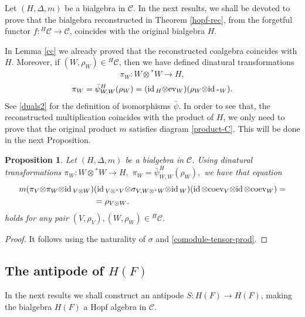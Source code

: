 \documentclass[11pt]{amsart}
\newcommand{\coev}{\mbox{coev}}
\newcommand{\ev}{\mbox{ev}}
\newcommand{\uc}{f}
\newcommand{\ot}{{\otimes}}
\newcommand{\vc}{{\mathcal C}}
\newcommand{\id}{\mbox{\rm id\,}}
\renewcommand{\_}[1]{\mbox{$_{\left( #1 \right)}$}}
\theoremstyle{plain}
\numberwithin{equation}{section}
\newtheorem{prop}[teo]{Proposition}
\theoremstyle{definition}
\theoremstyle{remark}
\def\pf{\begin{proof}}
\def\epf{\end{proof}}
\theoremstyle{introTheorems}
\begin{document}
Let $(H,\Delta, m)$ be a bialgebra in $\vc$. In the next results, we shall be devoted to prove that the  bialgebra reconstructed in Theorem \ref{hopf-rec}, from the forgetful functor  $\uc:{}^H\vc\to\vc$, coincides with the original  bialgebra $H$. 

\medbreak

In Lemma \ref{cc} we already proved that the reconstructed coalgebra coincides with $H$. Moreover, if $(W, \rho_W)\in {}^H\vc$, then we have defined dinatural transformations
$$\pi_W:W\ot {}^*W\to  H,$$  $$\pi_W=\bar{\psi}^H_{W,W}(\rho_W)=(\id_H\ot \ev_W)(\rho_W\ot \id_{{}^*W}).$$ See \eqref{duals2} for the definition of isomorphisms $\bar{\psi} $. In order to see that, the reconstructed multiplication coincides with the product of $H$, we only need  to prove that the original product $m$  satisfies diagram \eqref{product-C}. This will be done in the next Proposition.

\begin{prop}  Let $(H,\Delta, m)$ be a  bialgebra in $\vc$. Using dinatural transformations $\pi_W:W\ot {}^*W\to  H,$ $\pi_W=\bar{\psi}^H_{W,W}(\rho_W),$ we have that equation
\begin{align*} m (\pi_V\ot \pi_W\ot \id_{V\ot W})&(\id_{V\ot {}^*V}\ot \sigma_{V, W\ot {}^*W}\ot \id_W)(\id\ot \coev_V\ot\id\ot \coev_W)= \\
&=\rho_{V\ot W}.
\end{align*}
holds for any pair $(V, \rho_V), (W,\rho_W)\in  {}^H\vc$.
\end{prop}
\pf It follows using the naturality of $\sigma$ and \eqref{comodule-tensor-prod}.
\epf

\subsection{The antipode of $H(F)$} In the next results we shall  construct an antipode $S:H(F)\to H(F)$, making the bialgebra $ H(F)$ a Hopf algebra in $\vc$.
\end{document}
